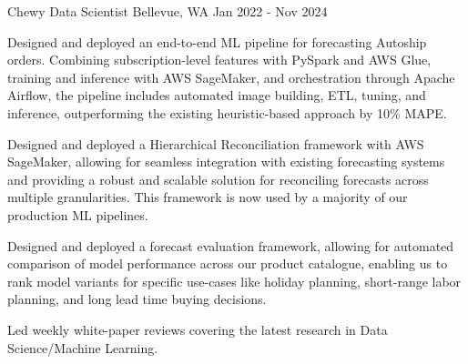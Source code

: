 \begin{cventries}

  \cveducationentry
    {Chewy} %
    {Data Scientist} %
    {Bellevue, WA} %
    {Jan 2022 - Nov 2024} %
    {
      \begin{cvitems}
        \item {Designed and deployed an end-to-end ML pipeline for forecasting Autoship orders. Combining subscription-level features with PySpark and AWS Glue, training and inference with AWS SageMaker, and orchestration through Apache Airflow, the pipeline includes automated image building, ETL, tuning, and inference, outperforming the existing heuristic-based approach by 10\% MAPE.}
        \item {Designed and deployed a Hierarchical Reconciliation framework with AWS SageMaker, allowing for seamless integration with existing forecasting systems and providing a robust and scalable solution for reconciling forecasts across multiple granularities. This framework is now used by a majority of our production ML pipelines.}
        \item {Designed and deployed a forecast evaluation framework, allowing for automated comparison of model performance across our product catalogue, enabling us to rank model variants for specific use-cases like holiday planning, short-range labor planning, and long lead time buying decisions.}
        \item {Led weekly white-paper reviews covering the latest research in Data Science/Machine Learning.}        
      \end{cvitems}
    }


\end{cventries}
